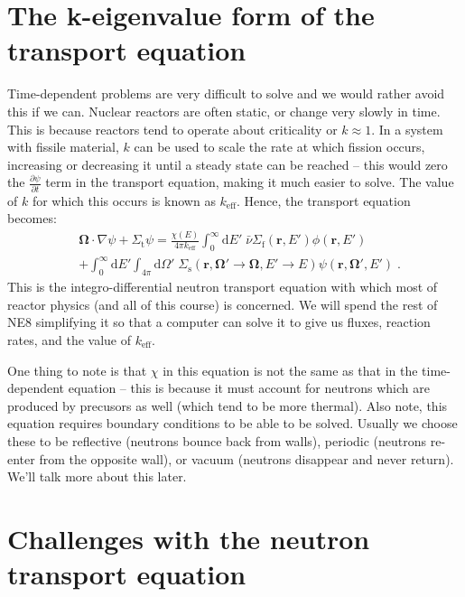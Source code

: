 \documentclass{article}
\begin{document}
\section{The k-eigenvalue form of the transport equation}

Time-dependent problems are very difficult to solve and we would rather avoid this if we can. Nuclear reactors are often static, or change very slowly in time. This is because reactors tend to operate about criticality or $k\approx1$. In a system with fissile material, $k$ can be used to scale the rate at which fission occurs, increasing or decreasing it until a steady state can be reached -- this would zero the $\frac{\partial \psi}{\partial t}$ term in the transport equation, making it much easier to solve. The value of $k$ for which this occurs is known as $k_\mathrm{eff}$. Hence, the transport equation becomes:
\begin{equation}\label{eq:NTE}
\begin{split}
    &\mathbf{\Omega}\cdot\nabla\psi + \Sigma_\mathrm{t}\psi
    =\frac{\chi(E)}{4\pi k_\mathrm{eff}}\int^\infty_0 \mathrm{d}E' \;\bar{\nu}\Sigma_\mathrm{f}(\mathbf{r},E')\phi(\mathbf{r},E') \\
    &+\int^\infty_0 \mathrm{d}E'\int_{4\pi}\mathrm{d}{\Omega}' \;\Sigma_\mathrm{s}\left(\mathbf{r},\mathbf{\Omega}'\rightarrow\mathbf{\Omega},E'\rightarrow E\right)\psi(\mathbf{r},\mathbf{\Omega}',E')\;\mathrm{.}
    \end{split}
\end{equation}
This is the integro-differential neutron transport equation with which most of reactor physics (and all of this course) is concerned. We will spend the rest of NE8 simplifying it so that a computer can solve it to give us fluxes, reaction rates, and the value of $k_\mathrm{eff}$.

One thing to note is that $\chi$ in this equation is not the same as that in the time-dependent equation -- this is because it must account for neutrons which are produced by precusors as well (which tend to be more thermal). Also note, this equation requires boundary conditions to be able to be solved. Usually we choose these to be reflective (neutrons bounce back from walls), periodic (neutrons re-enter from the opposite wall), or vacuum (neutrons disappear and never return). We'll talk more about this later.

\section{Challenges with the neutron transport equation}
\end{document}
